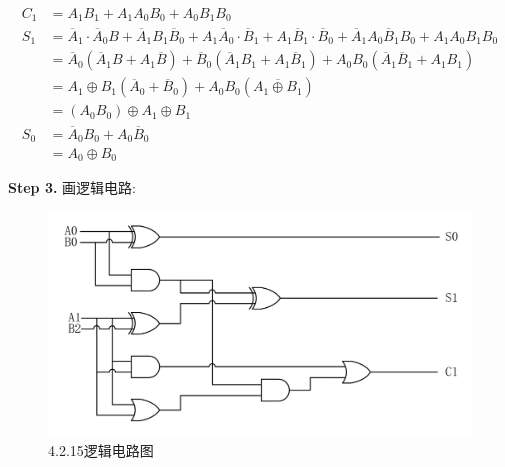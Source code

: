 \documentclass[a4paper,11pt,UTF8]{article}
\begin{document}
$$\begin{aligned}
	C_1&=A_1B_1+A_1A_0B_0+A_0B_1B_0\\
	S_1&=\overline{A}_1\cdot\overline{A}_0B+\overline{A}_1B_1\overline{B}_0+A_1\overline{A}_0\cdot\overline{B}_1+A_1\overline{B}_1\cdot\overline{B}_0+\overline{A}_1A_0\overline{B}_1B_0+A_1A_0B_1B_0\\
	&=\overline{A}_0(\overline{A}_1B+A_1\overline{B})+\overline{B}_0(\overline{A}_1B_1+A_1\overline{B}_1)+A_0B_0(\overline{A}_1\overline{B}_1+{A}_1{B}_1)\\
	&=A_1\oplus B_1(\overline{A}_0+\overline{B}_0)+A_0B_0(\overline{A_1\oplus B_1})\\
	&=(A_0B_0)\oplus A_1\oplus B_1\\
	S_0&=\overline{A}_0B_0+A_0\overline{B}_0\\
	&=A_0\oplus B_0
\end{aligned}
$$

\textbf{Step 3.} 画逻辑电路:
\begin{figure}[H]
	\centering
	\includegraphics[scale=0.30]{SD4.2.15_5}
	\caption{4.2.15逻辑电路图}
\end{figure}
\end{document}
